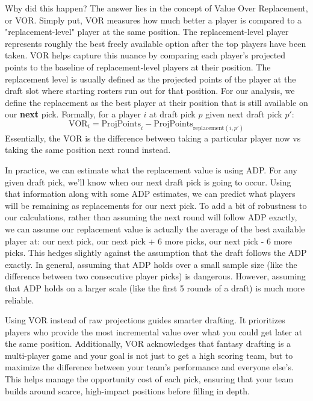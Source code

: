 \documentclass{article}
\begin{document}
Why did this happen? The answer lies in the concept of Value Over Replacement, or VOR.
Simply put, VOR measures how much better a player is compared to a "replacement-level" player at the same position.
The replacement-level player represents roughly the best freely available option after the top players have been taken.
VOR helps capture this nuance by comparing each player's projected points to the baseline of replacement-level players at their position.
The replacement level is usually defined as the projected points of the player at the draft slot where starting rosters run out for that position.
For our analysis, we define the replacement as the best player at their position that is still available on our \textbf{next} pick.
Formally, for a player \(i\) at draft pick $p$ given next draft pick $p'$:
\[
\text{VOR}_{i} = \text{ProjPoints}_{i} - \text{ProjPoints}_{\text{replacement}(i, p')}
\]
Essentially, the VOR is the difference between taking a particular player now vs taking the same position next round instead.

In practice, we can estimate what the replacement value is using ADP.
For any given draft pick, we'll know when our next draft pick is going to occur.
Using that information along with some ADP estimates, we can predict what players will be remaining as replacements for our next pick.
To add a bit of robustness to our calculations, rather than assuming the next round will follow ADP exactly, we can assume our replacement value is actually the average of the best available player at: our next pick, our next pick + 6 more picks, our next pick - 6 more picks.
This hedges slightly against the assumption that the draft follows the ADP exactly.
In general, assuming that ADP holds over a small sample size (like the difference between two consecutive player picks) is dangerous.
However, assuming that ADP holds on a larger scale (like the first 5 rounds of a draft) is much more reliable.

Using VOR instead of raw projections guides smarter drafting.
It prioritizes players who provide the most incremental value over what you could get later at the same position.
Additionally, VOR acknowledges that fantasy drafting is a multi-player game and your goal is not just to get a high scoring team, but to maximize the difference between your team's performance and everyone else's.
This helps manage the opportunity cost of each pick, ensuring that your team builds around scarce, high-impact positions before filling in depth.
\end{document}
